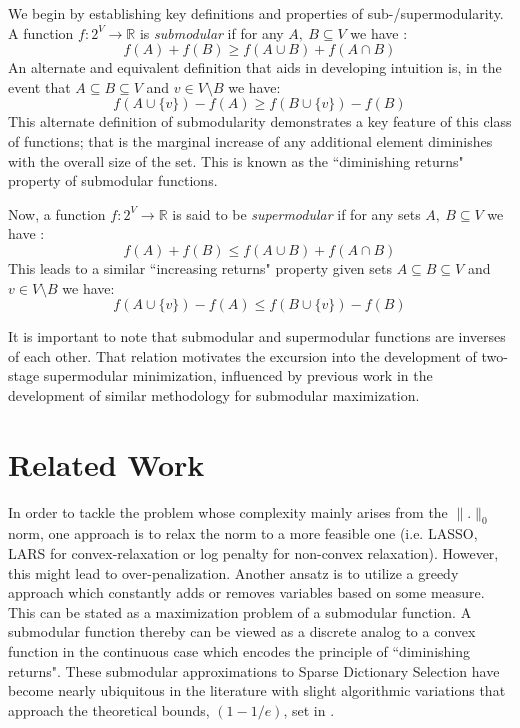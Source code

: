 \documentclass{article}
\newcommand{\R}{\mathbb{R}}
\begin{document}
\noindent We begin by establishing key definitions and properties of sub-/supermodularity.\\

\noindent A function $f:2^V\to \R$ is \textit{submodular} if for any $A,\ B \subseteq V$ we have : $$f(A) + f(B) \geq f(A\cup B) + f(A\cap B)$$ An alternate and equivalent definition that aids in developing intuition is, in the event that $A\subseteq B \subseteq V$ and $v\in V\setminus B$ we have: $$f(A\cup \{v\}) - f(A) \geq f(B\cup\{v\}) - f(B)$$
This alternate definition of submodularity demonstrates a key feature of this class of functions; that is the marginal increase of any additional element diminishes with the overall size of the set. This is known as the ``diminishing returns" property of submodular functions.

\noindent Now, a function $f:2^V\to \R$ is said to be \textit{supermodular} if for any sets $A,\ B \subseteq V$ we have : $$f(A) + f(B) \leq f(A\cup B) + f(A\cap B)$$ This leads to a similar ``increasing returns" property given sets $A\subseteq B \subseteq V$ and $v\in V\setminus B$ we have: $$f(A\cup \{v\}) - f(A) \leq f(B\cup\{v\}) - f(B)$$

\noindent It is important to note that submodular and supermodular functions are inverses of each other. That relation motivates the excursion into the development of two-stage supermodular minimization, influenced by previous work in the development of similar methodology for submodular maximization.

\section{Related Work}\label{sec:prior-work}

In order to tackle the problem whose complexity mainly arises from the $\| .\|_0$ norm, one approach is to relax the norm to a more feasible one (i.e. LASSO, LARS for convex-relaxation or log penalty for non-convex relaxation). However, this might lead to over-penalization\cite{nonconvexrelax}. Another ansatz is to utilize a greedy approach which constantly adds or removes variables based on some measure\cite{submod_spectral}.  This can be stated as a maximization problem of a submodular function. A submodular function thereby can be viewed as a discrete analog to a convex function in the continuous case\cite{submod_sparsecoding} which encodes the principle of ``diminishing returns". These submodular approximations to Sparse Dictionary Selection have become nearly ubiquitous in the literature with slight algorithmic variations that approach the theoretical bounds, $(1 - 1/e)$, set in \cite{Krause05near-optimalnonmyopic}.
\\
\end{document}

